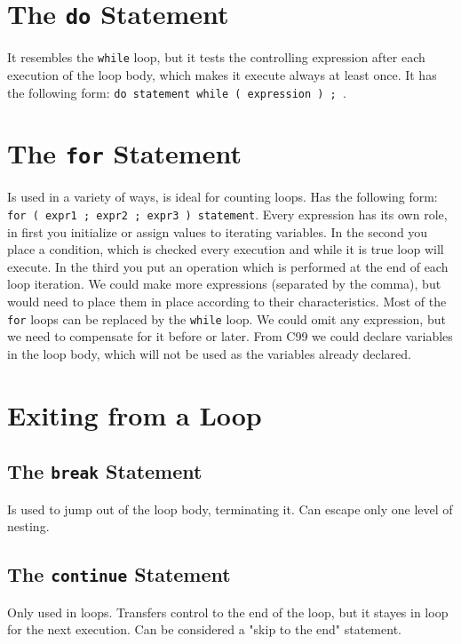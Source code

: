 \documentclass[openany]{book}
\begin{document}
    \section{The \texttt{do} Statement}
    It resembles the \texttt{while} loop, but it tests the controlling
    expression after each execution of the loop body, which makes it execute
    always at least once. It has the following form: \texttt{do statement
    while ( expression ) ; }.
    
    \section{The \texttt{for} Statement}
    Is used in a variety of ways, is ideal for counting loops. Has the following
    form: \texttt{for ( expr1 ; expr2 ; expr3 ) statement}. Every expression has
    its own role, in first you initialize or assign values to iterating variables.
    In the second you place a condition, which is checked every execution and while
    it is true loop will execute. In the third you put an operation which is performed
    at the end of each loop iteration. We could make more expressions (separated by
    the comma), but would need to place them in place according to their characteristics.
    Most of the \texttt{for} loops can be replaced by the \texttt{while} loop. We could
    omit any expression, but we need to compensate for it before or later. From C99
    we could declare variables in the loop body, which will not be used as the
    variables already declared.
    

    \section{Exiting from a Loop}

    \subsection{The \texttt{break} Statement}
    Is used to jump out of the loop body, terminating it. Can escape only one level
    of nesting.

    \subsection{The \texttt{continue} Statement}
    Only used in loops. Transfers control to the end of the loop, but it stayes in
    loop for the next execution. Can be considered a
    "skip to the end" statement.
\end{document}
